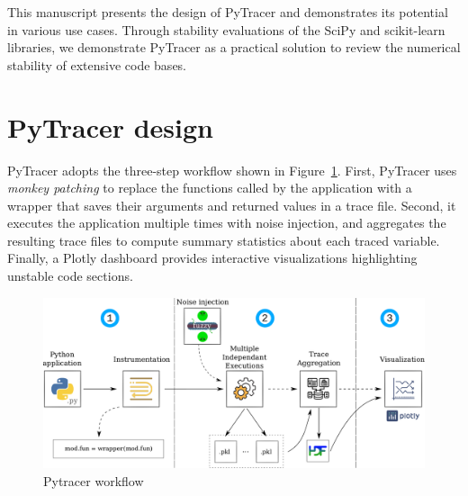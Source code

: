 \documentclass[11pt]{article}
\newcommand{\tristan}[1]{\color{orange}\textbf{From Tristan:} #1\color{black}\xspace}
\newcommand{\gkmod}[2]{\color{purple}\sout{#1} #2\color{black}\xspace}
\newcommand{\Yohan}[1]{\color{green!75!black}\textbf{Yohan:} #1\color{black}\xspace}
\newcommand{\pytracer}[0]{PyTracer\xspace}
\begin{document}
This manuscript presents the design of \pytracer and demonstrates its potential in various use cases. 
Through stability evaluations of the
SciPy and scikit-learn libraries, we demonstrate \pytracer as a practical solution to review the numerical stability of extensive code bases. 



\section{\pytracer design}

\pytracer adopts the three-step workflow shown in Figure~\ref{fig:workflow}. First, \pytracer uses \textit{monkey patching} to replace the functions called by the application with a wrapper that saves their arguments and returned values in a trace file.
Second, it executes the application multiple times with noise injection, and aggregates the resulting trace files to compute summary statistics about each traced variable. Finally, a Plotly dashboard provides interactive visualizations highlighting unstable code sections.


\begin{figure}
    \centering
    \includegraphics[width=\linewidth]{figure/workflow.pdf}
    \caption{Pytracer workflow
    }
    \label{fig:workflow}
\end{figure}
\end{document}
